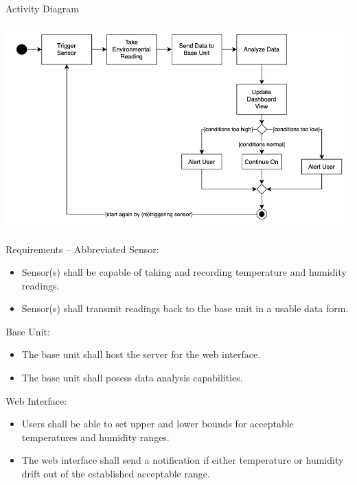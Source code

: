 \documentclass{beamer}
\begin{document}
  \begin{frame}{\sectitle}{Activity Diagram}
    \begin{center}
      \includegraphics[scale=.35]{images/AD.png}
    \end{center}
  \end{frame}

  \begin{frame}{\sectitle}{Requirements -- Abbreviated}
    Sensor:
    \begin{itemize}\scriptsize
      \item Sensor(s) shall be capable of taking and recording temperature and humidity readings.
      \item Sensor(s) shall transmit readings back to the base unit in a usable data form.
    \end{itemize}
    \vspace*{.5em}
    Base Unit:
    \begin{itemize}\scriptsize
      \item The base unit shall host the server for the web interface.
      \item The base unit shall posess data analysis capabilities.
    \end{itemize}
    \vspace*{.5em}
    Web Interface:
    \begin{itemize}\scriptsize
      \item Users shall be able to set upper and lower bounds for acceptable temperatures and humidity ranges.
      \item The web interface shall send a notification if either temperature or humidity drift out of the established acceptable range.
    \end{itemize}
  \end{frame}
\end{document}
